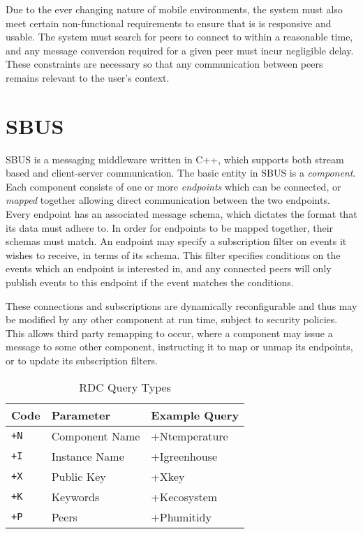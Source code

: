 \documentclass[12pt,twoside,notitlepage]{report}
\begin{document}
Due to the ever changing nature of mobile environments, the system must also meet certain non-functional requirements to ensure that is is responsive and usable. 
The system must search for peers to connect to within a reasonable time, and any message conversion required for a given peer must incur negligible delay.
These constraints are necessary so that any communication between peers remains relevant to the user's context.

\section{SBUS}

SBUS \cite{ingram2009reconfigurable} is a messaging middleware written in C++, which supports both stream based and client-server communication. 
The basic entity in SBUS is a {\sl component}. 
Each component consists of one or more {\sl endpoints} which can be connected, or {\sl mapped} together allowing direct communication between the two endpoints. 
Every endpoint has an associated message schema, which dictates the format that its data must adhere to. 
In order for endpoints to be mapped together, their schemas must match. 
An endpoint may specify a subscription filter on events it wishes to receive, in terms of its schema. 
This filter specifies conditions on the events which an endpoint is interested in, and any connected peers will only publish events to this endpoint if the event matches the conditions.

These connections and subscriptions are dynamically reconfigurable and thus may be modified by any other component at run time, subject to security policies. 
This allows third party remapping to occur, where a component may issue a message to some other component, instructing it to map or unmap its endpoints, or to update its subscription filters. 

\begin{table}
\centering

\begin{tabular}{l l l}
\hline\hline
Code	&	Parameter 	& Example Query\\
\hline

{\tt +N}	&	Component Name	& +Ntemperature \\
{\tt +I}	&	Instance Name	& +Igreenhouse \\
{\tt +X}	&	Public Key		& +Xkey \\
{\tt +K}	&	Keywords		& +Kecosystem \\
{\tt +P}	&	Peers 			& +Phumitidy \\

\hline
\hline
\end{tabular}

\caption{RDC Query Types}
\label{tab:rdc_queries}
\end{table}
\end{document}
